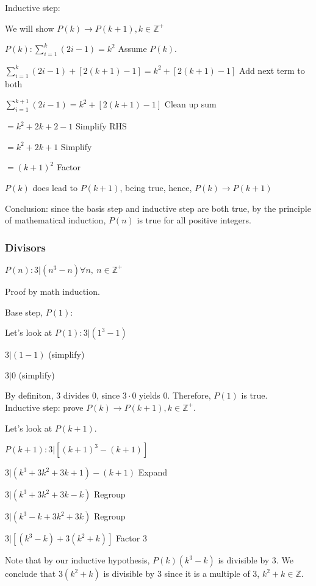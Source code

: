 \documentclass[english,openany]{book}
\begin{document}
    Inductive step:

    We will show $P(k) \rightarrow P(k+1), k \in \mathbb Z^+$

    $P(k): \sum_{i=1}^{k} (2i-1) = k^2$ Assume $P(k)$.

    $\sum_{i=1}^{k} (2i-1) + [2(k+1)-1] = k^2 + [2(k+1)-1]$ Add next term to both

    $\sum_{i=1}^{k+1} (2i-1) = k^2 + [2(k+1)-1]$ Clean up sum

    \qquad \qquad $= k^2 + 2k + 2 - 1$ Simplify RHS

    \qquad \qquad $= k^2 + 2k + 1$ Simplify

    \qquad \qquad $= (k+1)^2$ Factor

    $P(k)$ does lead to $P(k+1)$, being true, hence, $P(k) \rightarrow P(k+1)$

    Conclusion: since the basis step and inductive step are both true, by the principle of mathematical induction, $P(n)$ is true for all positive integers.\\

    \subsubsection{Divisors}

    $P(n): 3|(n^3 - n) \forall n,\ n \in \mathbb Z^+$

    Proof by math induction.

    Base step, $P(1)$:

    Let's look at $P(1): 3|(1^3 - 1)$

    $3|(1-1)$ (simplify)

    $3|0$ (simplify)

    By definiton, 3 divides 0, since $3 \cdot 0$ yields 0. Therefore, $P(1)$ is true.\\

    Inductive step: prove $P(k) \rightarrow P(k+1), k \in \mathbb Z^+$.

    Let's look at $P(k+1)$.

    $P(k+1) : 3|[(k+1)^3 - (k+1)]$

    $3|(k^3+3k^2+3k+1)-(k+1)$ Expand

    $3|(k^3 + 3k^2 + 3k - k)$ Regroup

    $3|(k^3 - k + 3k^2 + 3k)$ Regroup

    $3|[(k^3-k)+3(k^2+k)]$ Factor 3

    Note that by our inductive hypothesis, $P(k) (k^3-k)$ is divisible by 3. We conclude that $3(k^2+k)$ is divisible by 3 since it is a multiple of 3, $k^2 + k \in \mathbb Z$.
\end{document}
